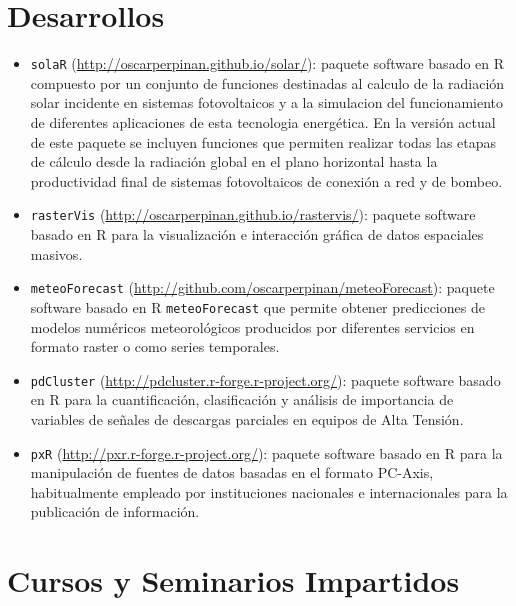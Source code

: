 \documentclass[article, a4paper]{memoir}
\begin{document}
\section{Desarrollos}
\label{sec-7}


\begin{itemize}
\item \texttt{solaR} (\url{http://oscarperpinan.github.io/solar/}): paquete software basado
en R compuesto por un conjunto de funciones destinadas al calculo de
la radiación solar incidente en sistemas fotovoltaicos y a la
simulacion del funcionamiento de diferentes aplicaciones de esta
tecnologia energética. En la versión actual de este paquete se
incluyen funciones que permiten realizar todas las etapas de cálculo
desde la radiación global en el plano horizontal hasta la
productividad final de sistemas fotovoltaicos de conexión a red y de
bombeo.

\item \texttt{rasterVis} (\url{http://oscarperpinan.github.io/rastervis/}): paquete software
basado en R para la visualización e interacción gráfica de datos
espaciales masivos.

\item \texttt{meteoForecast} (\url{http://github.com/oscarperpinan/meteoForecast}):
paquete software basado en R \texttt{meteoForecast} que permite obtener
predicciones de modelos numéricos meteorológicos producidos por
diferentes servicios en formato raster o como series temporales.

\item \texttt{pdCluster} (\url{http://pdcluster.r-forge.r-project.org/}): paquete
software basado en R para la cuantificación, clasificación y
análisis de importancia de variables de señales de descargas
parciales en equipos de Alta Tensión.

\item \texttt{pxR} (\url{http://pxr.r-forge.r-project.org/}): paquete software basado en
R para la manipulación de fuentes de datos basadas en el formato
PC-Axis, habitualmente empleado por instituciones nacionales e
internacionales para la publicación de información.
\end{itemize}



\section{Cursos y Seminarios Impartidos}
\label{sec-8}
\end{document}
